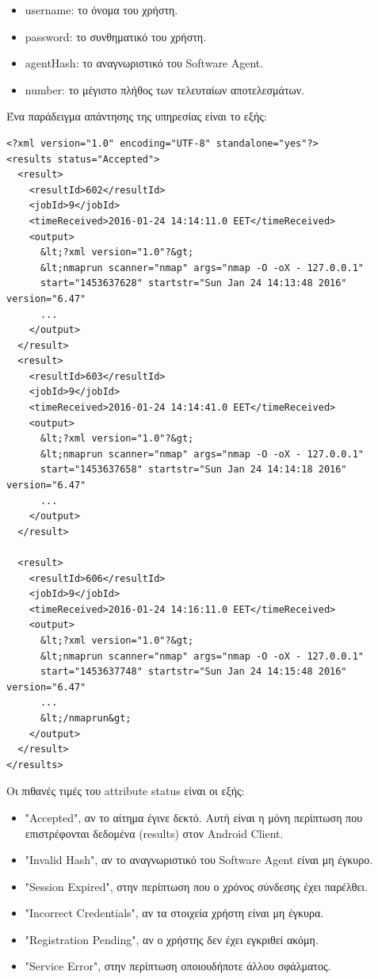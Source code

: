 \documentclass[a4paper,11pt]{article}
\begin{document}
\begin{sloppypar}
\begin{itemize}
\item username: το όνομα του χρήστη.
\item password: το συνθηματικό του χρήστη.
\item agentHash: το αναγνωριστικό του Software Agent.
\item number: το μέγιστο πλήθος των τελευταίων αποτελεσμάτων.
\end{itemize}
Ένα παράδειγμα απάντησης της υπηρεσίας είναι το εξής:
\begin{lstlisting}
<?xml version="1.0" encoding="UTF-8" standalone="yes"?>
<results status="Accepted">
  <result>
    <resultId>602</resultId>
    <jobId>9</jobId>
    <timeReceived>2016-01-24 14:14:11.0 EET</timeReceived>
    <output>
      &lt;?xml version="1.0"?&gt;
      &lt;nmaprun scanner="nmap" args="nmap -O -oX - 127.0.0.1"
      start="1453637628" startstr="Sun Jan 24 14:13:48 2016" version="6.47"
      ...
    </output>
  </result>
  <result>
    <resultId>603</resultId>
    <jobId>9</jobId>
    <timeReceived>2016-01-24 14:14:41.0 EET</timeReceived>
    <output>
      &lt;?xml version="1.0"?&gt;
      &lt;nmaprun scanner="nmap" args="nmap -O -oX - 127.0.0.1"
      start="1453637658" startstr="Sun Jan 24 14:14:18 2016" version="6.47"
      ...
    </output>
  </result>

  <result>
    <resultId>606</resultId>
    <jobId>9</jobId>
    <timeReceived>2016-01-24 14:16:11.0 EET</timeReceived>
    <output>
      &lt;?xml version="1.0"?&gt;
      &lt;nmaprun scanner="nmap" args="nmap -O -oX - 127.0.0.1"
      start="1453637748" startstr="Sun Jan 24 14:15:48 2016" version="6.47"
      ...
      &lt;/nmaprun&gt;
    </output>
  </result>
</results>
\end{lstlisting}
Οι πιθανές τιμές του attribute status είναι οι εξής:
\begin{itemize}
\item "Accepted", αν το αίτημα έγινε δεκτό. Αυτή είναι η μόνη περίπτωση που επιστρέφονται δεδομένα (results) στον Android Client.
\item "Invalid Hash", αν το αναγνωριστικό του Software Agent είναι μη έγκυρο.
\item "Session Expired", στην περίπτωση που ο χρόνος σύνδεσης έχει παρέλθει.
\item "Incorrect Credentials", αν τα στοιχεία χρήστη είναι μη έγκυρα.
\item "Registration Pending", αν ο χρήστης δεν έχει εγκριθεί ακόμη.
\item "Service Error", στην περίπτωση οποιουδήποτε άλλου σφάλματος.
\end{itemize}



\end{sloppypar}
\end{document}
